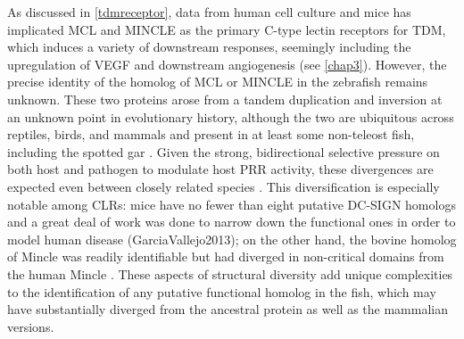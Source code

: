 As discussed in \autoref{tdmreceptor}, data from human cell culture and mice has implicated MCL and MINCLE as the primary C-type lectin receptors for TDM, which induces a variety of downstream responses, seemingly including the upregulation of VEGF and downstream angiogenesis (see \autoref{chap3}). However, the precise identity of the homolog of MCL or MINCLE in the zebrafish remains unknown. These two proteins arose from a tandem duplication and inversion at an unknown point in evolutionary history, although the two are ubiquitous across reptiles, birds, and mammals and present in at least some non-teleost fish, including the spotted gar \citep{Miyake2013, Richardson2014}. Given the strong, bidirectional selective pressure on both host and pathogen to modulate host PRR activity, these divergences are expected even between closely related species \citep{Rambaruth2015}. This diversification is especially notable among CLRs: mice have no fewer than eight putative DC-SIGN homologs and a great deal of work was done to narrow down the functional ones in order to model human disease (GarciaVallejo2013); on the other hand, the bovine homolog of Mincle was readily identifiable but had diverged in non-critical domains from the human Mincle \citep{Feinberg2013, Furukawa2013}. These aspects of structural diversity add unique complexities to the identification of any putative functional homolog in the fish, which may have substantially diverged from the ancestral protein as well as the mammalian versions.




